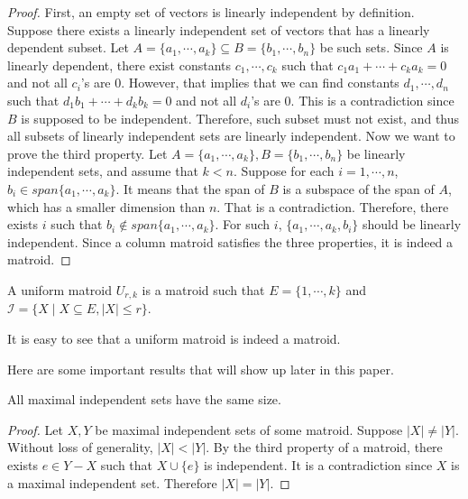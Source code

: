 \begin{proof}
First, an empty set of vectors is linearly independent by definition.
Suppose there exists a linearly independent set of vectors that has a linearly dependent subset.
Let $A = \{a_1, \cdots, a_k\} \subseteq B = \{b_1, \cdots, b_n\}$ be such sets.
Since $A$ is linearly dependent, there exist constants $c_1, \cdots, c_k$ such that $c_1 a_1 + \cdots + c_k a_k = 0$ and not all $c_i$'s are $0$.
However, that implies that we can find constants $d_1, \cdots, d_n$ such that $d_1 b_1 + \cdots + d_k b_k = 0$ and not all $d_i$'s are $0$.
This is a contradiction since $B$ is supposed to be independent.
Therefore, such subset must not exist, and thus all subsets of linearly independent sets are linearly independent.
Now we want to prove the third property.
Let $A = \{a_1, \cdots, a_k\}, B = \{b_1, \cdots, b_n\}$ be linearly independent sets, and assume that $k < n$.
Suppose for each $i = 1, \cdots, n$, $b_i \in span\{ a_1, \cdots, a_k \}$.
It means that the span of $B$ is a subspace of the span of $A$, which has a smaller dimension than $n$.
That is a contradiction.
Therefore, there exists $i$ such that $b_i \notin span \{ a_1, \cdots, a_k \}$.
For such $i$, $\{ a_1, \cdots, a_k, b_i \}$ should be linearly independent.
Since a column matroid satisfies the three properties, it is indeed a matroid.
\end{proof}


\begin{defn}
A uniform matroid $U_{r, k}$ is a matroid such that $E = \{ 1, \cdots, k \}$ and $\mathcal{I} = \{ X \mid  X \subseteq E, \lvert X \rvert \leq r \}$.
\end{defn}

It is easy to see that a uniform matroid is indeed a matroid.


Here are some important results that will show up later in this paper.

\begin{thm}
All maximal independent sets have the same size.
\end{thm}

\begin{proof}
Let $X, Y$ be maximal independent sets of some matroid.
Suppose $\lvert X \rvert \neq \lvert Y \rvert$.
Without loss of generality, $\lvert X \rvert < \lvert Y \rvert$.
By the third property of a matroid, there exists $e \in Y - X$ such that $X \cup \{ e \}$ is independent.
It is a contradiction since $X$ is a maximal independent set.
Therefore $\lvert X \rvert = \lvert Y \rvert$.
\end{proof}

